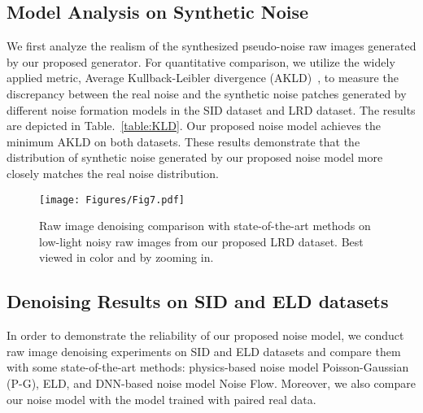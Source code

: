 \documentclass[10pt,twocolumn,letterpaper]{article}
\begin{document}
\subsection{Model Analysis on Synthetic Noise}
\vspace{-0.5em}
We first analyze the realism of the synthesized pseudo-noise raw images generated by our proposed generator. For quantitative comparison, we utilize the widely applied metric, Average Kullback-Leibler divergence (AKLD)~\cite{yue2020dual}, to measure the discrepancy between the real noise and the synthetic noise patches generated by different noise formation models in the SID dataset and LRD dataset. The results are depicted in Table.~\ref{table:KLD}. Our proposed noise model achieves the minimum AKLD on both datasets. These results demonstrate that the distribution of synthetic noise generated by our proposed noise model more closely matches the real noise distribution.

\begin{figure*}
\begin{center}
\texttt{[image: Figures/Fig7.pdf]}
\caption{Raw image denoising comparison with state-of-the-art methods on low-light noisy raw images from our proposed LRD dataset. Best viewed in color and by zooming in.}
\label{fig:LRD}
\end{center}
\vspace{-3ex}
\end{figure*}

\vspace{-0.5em}
\subsection{Denoising Results on SID and ELD datasets}
\vspace{-0.5em}
In order to demonstrate the reliability of our proposed noise model, we conduct raw image denoising experiments on SID and ELD datasets and compare them with some state-of-the-art methods: physics-based noise model Poisson-Gaussian (P-G), ELD, and DNN-based noise model Noise Flow. Moreover, we also compare our noise model with the model trained with paired real data.
\end{document}
